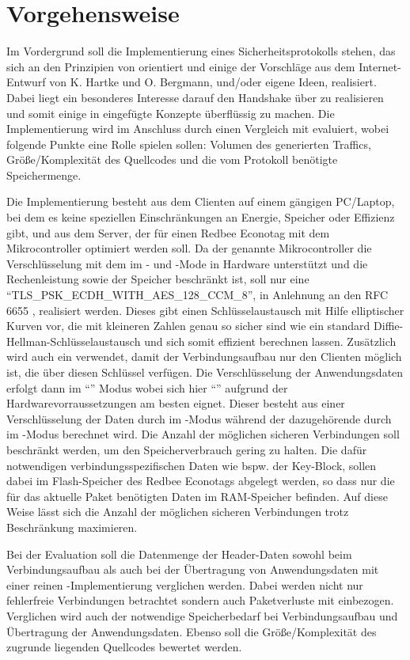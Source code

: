 \chapter{Vorgehensweise}

Im Vordergrund soll die Implementierung eines Sicherheitsprotokolls stehen, das sich an den Prinzipien von  orientiert
und einige der Vorschläge aus dem Internet-Entwurf von K. Hartke und O. Bergmann, und/oder eigene Ideen, realisiert.
Dabei liegt ein besonderes Interesse darauf den Handshake über  \cite{draftcoap13} zu realisieren und somit einige in  eingefügte
Konzepte überflüssig zu machen. Die Implementierung wird im Anschluss durch einen Vergleich mit  evaluiert, wobei folgende Punkte eine
Rolle spielen sollen: Volumen des generierten Traffics, Größe/Komplexität des Quellcodes und die vom Protokoll benötigte Speichermenge.

Die Implementierung besteht aus dem Clienten auf einem gängigen PC/Laptop, bei dem es keine speziellen Einschränkungen an Energie,
Speicher oder Effizienz gibt, und aus dem Server, der für einen Redbee Econotag \cite{econotag} mit dem 
Mikrocontroller \cite{mc1322} optimiert werden soll. Da der genannte Mikrocontroller die Verschlüsselung mit dem  im - und -Mode
in Hardware unterstützt und die Rechenleistung sowie der Speicher beschränkt ist, soll nur eine  "`TLS\_PSK\_ECDH\_WITH\_AES\_128\_CCM\_8"',
in Anlehnung an den RFC 6655 \cite{rfc6655}, realisiert werden. Dieses gibt einen Schlüsselaustausch mit
Hilfe elliptischer Kurven vor, die mit kleineren Zahlen genau so sicher sind wie ein standard Diffie-Hellman-Schlüsselaustausch und sich somit
effizient berechnen lassen. Zusätzlich wird auch ein  verwendet, damit der Verbindungsaufbau nur den Clienten möglich ist, die über diesen
Schlüssel verfügen. Die Verschlüsselung der Anwendungsdaten erfolgt dann im "`"' Modus \cite{rfc5116}
wobei sich hier "`"' \cite{rfc3610} aufgrund der Hardwarevorraussetzungen am besten eignet. Dieser besteht
aus einer Verschlüsselung der Daten durch  im -Modus während der dazugehörende  durch  im -Modus berechnet wird.
Die Anzahl der möglichen sicheren Verbindungen soll beschränkt werden, um den Speicherverbrauch gering zu halten.
Die dafür notwendigen verbindungsspezifischen Daten wie bspw. der Key-Block, sollen dabei im Flash-Speicher des Redbee Econotags
abgelegt werden, so dass nur die für das aktuelle Paket benötigten Daten im RAM-Speicher befinden. Auf diese Weise lässt sich
die Anzahl der möglichen sicheren Verbindungen trotz Beschränkung maximieren.

Bei der Evaluation soll die Datenmenge der Header-Daten sowohl beim Verbindungsaufbau als auch bei der Übertragung von Anwendungsdaten
mit einer reinen -Implementierung verglichen werden. Dabei werden nicht nur fehlerfreie Verbindungen betrachtet sondern auch Paketverluste
mit einbezogen. Verglichen wird auch der notwendige Speicherbedarf bei Verbindungsaufbau und Übertragung der Anwendungsdaten.
Ebenso soll die Größe/Komplexität des zugrunde liegenden Quellcodes bewertet werden.